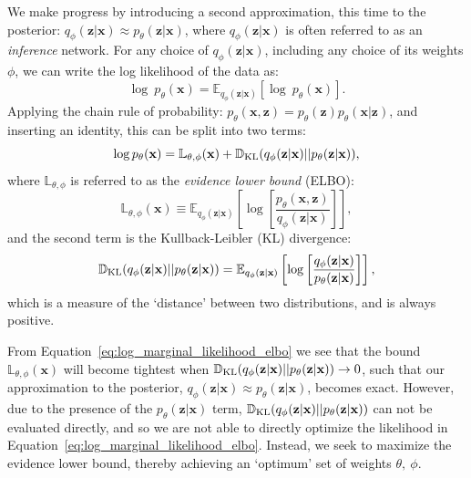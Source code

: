 \documentclass[fleqn,usenatbib]{mnras}
\begin{document}
We make progress by introducing a second approximation, this time to the posterior: $q_\phi(\mathbf z | \mathbf{x}) \approx p_\theta(\mathbf z | \mathbf{x})$, where $q_\phi(\mathbf z | \mathbf x)$ is often referred to as an \emph{inference} network. For any choice of $q_\phi(\mathbf z | \mathbf x)$, including any choice of its weights $\phi$, we can write the log likelihood of the data as:
\begin{equation}
\label{eq:log_marginal_likelihood}
    \log~p_\theta(\mathbf x) = \mathbb{E}_{q_\phi(\mathbf z | \mathbf x)}\left[\log~p_\theta(\mathbf x) \right] .
\end{equation}
Applying the chain rule of probability: $p_\theta(\mathbf x, \mathbf z) = p_\theta(\mathbf z) p_\theta(\mathbf x | \mathbf z)$, and inserting an identity, this can be split into two terms:
\begin{equation}
\label{eq:log_marginal_likelihood_elbo}
    \log p_\theta(\mathbf x) = \mathbb{L}_{\theta, \phi}(\mathbf x) + 
    \mathbb{D}_{\rm KL}(q_\phi(\mathbf z | \mathbf x) || p_\theta(\mathbf{z} | \mathbf{x})),
\end{equation}
where $\mathbb{L}_{\theta, \phi}$ is referred to as the \emph{evidence lower bound} (ELBO):
\begin{equation}
\label{eq:elbo}
    \mathbb{L}_{\theta, \phi}(\mathbf x) \equiv \mathbb{E}_{q_\phi(\mathbf z | \mathbf x)}\left[\log \left[ \frac{p_\theta(\mathbf x, \mathbf z)}{q_\phi(\mathbf z | \mathbf x)}\right] \right],
\end{equation}
and the second term is the Kullback-Leibler (KL) divergence:
\begin{equation}
\label{eq:kld}
    \mathbb{D}_{\rm KL}(q_\phi(\mathbf z | \mathbf x)||p_\theta(\mathbf z | \mathbf x)) = 
    \mathbb{E}_{q_\phi(\mathbf z | \mathbf x)}\left[ \log \left[ \frac{q_\phi(\mathbf z | \mathbf x)}{p_\theta(\mathbf z | \mathbf x)} \right] \right],
\end{equation}
which is a measure of the `distance' between two distributions, and is always positive. 

From Equation~\ref{eq:log_marginal_likelihood_elbo} we see that the bound $\mathbb{L}_{\theta, \phi}(\mathbf x)$ will become tightest when $\mathbb{D}_{\rm KL}(q_\phi(\mathbf z | \mathbf x)||p_\theta(\mathbf z | \mathbf x))\rightarrow 0$, such that our approximation to the posterior, $q_\phi(\mathbf z | \mathbf x) \approx p_\theta(\mathbf z | \mathbf x)$, becomes exact. However, due to the presence of the $p_\theta(\mathbf z | \mathbf x)$ term, $\mathbb{D}_{\rm KL}(q_\phi(\mathbf z | \mathbf x)||p_\theta(\mathbf z | \mathbf x))$ can not be evaluated directly, and so we are not able to directly optimize the likelihood in Equation~\ref{eq:log_marginal_likelihood_elbo}. Instead, we seek to maximize the evidence lower bound, thereby achieving an `optimum' set of weights $\theta,~\phi$. 
\end{document}
